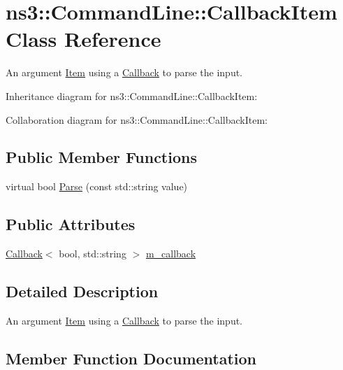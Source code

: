 \hypertarget{classns3_1_1CommandLine_1_1CallbackItem}{}\section{ns3\+:\+:Command\+Line\+:\+:Callback\+Item Class Reference}
\label{classns3_1_1CommandLine_1_1CallbackItem}


An argument \hyperlink{classns3_1_1CommandLine_1_1Item}{Item} using a \hyperlink{classns3_1_1Callback}{Callback} to parse the input.  




Inheritance diagram for ns3\+:\+:Command\+Line\+:\+:Callback\+Item\+:


Collaboration diagram for ns3\+:\+:Command\+Line\+:\+:Callback\+Item\+:
\subsection*{Public Member Functions}
\begin{DoxyCompactItemize}
\item 
virtual bool \hyperlink{classns3_1_1CommandLine_1_1CallbackItem_a701690b58f756d9a89b227d3d228bd80}{Parse} (const std\+::string value)
\end{DoxyCompactItemize}
\subsection*{Public Attributes}
\begin{DoxyCompactItemize}
\item 
\hyperlink{classns3_1_1Callback}{Callback}$<$ bool, std\+::string $>$ \hyperlink{classns3_1_1CommandLine_1_1CallbackItem_a12c1d9f1e7035f5f9fb78c446b0c7c90}{m\+\_\+callback}
\end{DoxyCompactItemize}


\subsection{Detailed Description}
An argument \hyperlink{classns3_1_1CommandLine_1_1Item}{Item} using a \hyperlink{classns3_1_1Callback}{Callback} to parse the input. 

\subsection{Member Function Documentation}
